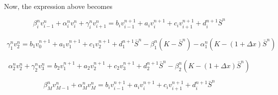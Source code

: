 Now, the expression above becomes

\begin{equation}
    \beta^{n}_{i} v^{n}_{i-1} + \alpha^{n}_{i} v^{n}_{i} + \gamma^{n}_{i} v^{n}_{i+1} = b_i v^{n+1}_{i-1} + a_i v^{n+1}_{i} + c_i v^{n+1}_{i+1} + d^{n+1}_{i}\bar{S}^{n}
\end{equation}

\begin{align}
    \gamma^{n}_{1} v^{n}_{2} = b_1 v^{n+1}_{0} + a_1 v^{n+1}_{1} + c_1 v^{n+1}_{2} + d^{n+1}_{1}\bar{S}^{n} - \beta^{n}_{1} (K - \bar{S}^n) - \alpha^{n}_{1} (K - (1+\Delta x)\bar{S}^n) 
\end{align}

\begin{equation}
    \alpha^{n}_{2} v^{n}_{2} + \gamma^{n}_{2} v^{n}_{3} = b_2 v^{n+1}_{1} + a_2 v^{n+1}_{2} + c_2 v^{n+1}_{3} + d^{n+1}_{2}\bar{S}^{n} - \beta^{n}_{2} (K - (1+\Delta x)\bar{S}^n) 
\end{equation}

\begin{equation}
    \beta^{n}_{M} v^{n}_{M-1} + \alpha^{n}_{M} v^{n}_{M} = b_i v^{n+1}_{i-1} + a_i v^{n+1}_{i} + c_i v^{n+1}_{i+1} + d^{n+1}_{i}\bar{S}^{n}
\end{equation}
